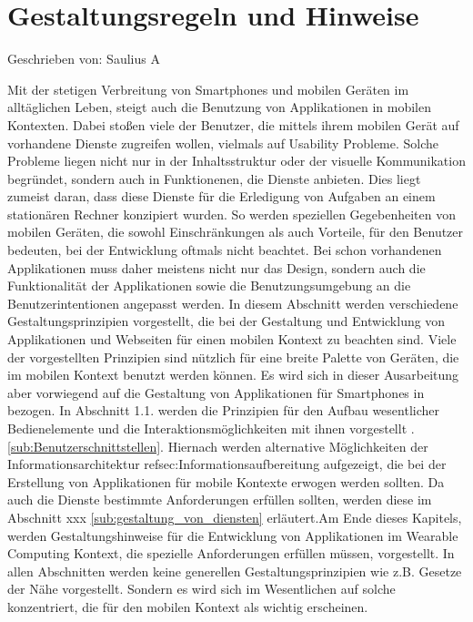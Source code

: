 
\section{Gestaltungsregeln und Hinweise}

Geschrieben von: Saulius A

Mit der stetigen Verbreitung von Smartphones und mobilen Geräten im alltäglichen Leben, steigt auch die Benutzung von Applikationen in mobilen Kontexten. Dabei stoßen viele der Benutzer, die mittels ihrem mobilen Gerät auf vorhandene Dienste zugreifen wollen, vielmals auf Usability Probleme. Solche Probleme liegen nicht nur in der Inhaltsstruktur oder der visuelle Kommunikation begründet, sondern auch in Funktionenen, die Dienste anbieten. Dies liegt zumeist daran, dass diese Dienste für die Erledigung von Aufgaben an einem stationären Rechner konzipiert wurden. So werden speziellen Gegebenheiten von mobilen Geräten, die sowohl Einschränkungen als auch Vorteile, für den Benutzer bedeuten, bei der Entwicklung oftmals nicht beachtet.
Bei schon vorhandenen Applikationen muss daher meistens nicht nur das Design, sondern auch die Funktionalität der Applikationen sowie die Benutzungsumgebung an die Benutzerintentionen angepasst werden. 
In diesem Abschnitt werden verschiedene Gestaltungsprinzipien vorgestellt, die bei der Gestaltung und Entwicklung von Applikationen und Webseiten  für einen mobilen Kontext zu beachten sind. Viele der vorgestellten Prinzipien sind nützlich für eine breite Palette von Geräten, die im mobilen Kontext benutzt werden können. Es wird sich in dieser Ausarbeitung aber vorwiegend auf die Gestaltung von Applikationen für Smartphones in bezogen. In Abschnitt 1.1. werden die Prinzipien für den Aufbau wesentlicher Bedienelemente und die Interaktionsmöglichkeiten mit ihnen vorgestellt .\ref{sub:Benutzerschnittstellen}. Hiernach werden alternative Möglichkeiten der Informationsarchitektur ref{sec:Informationsaufbereitung} aufgezeigt, die bei der Erstellung von Applikationen für mobile Kontexte erwogen werden sollten. Da auch die Dienste bestimmte Anforderungen erfüllen sollten, werden diese im Abschnitt xxx \ref{sub:gestaltung_von_diensten} erläutert.Am Ende dieses Kapitels, werden Gestaltungshinweise für die Entwicklung von Applikationen im Wearable Computing Kontext, die spezielle Anforderungen erfüllen müssen, vorgestellt.
In allen Abschnitten werden keine generellen Gestaltungsprinzipien wie z.B.  Gesetze der Nähe vorgestellt. Sondern es wird sich im Wesentlichen auf solche konzentriert, die für den mobilen Kontext als wichtig erscheinen.

